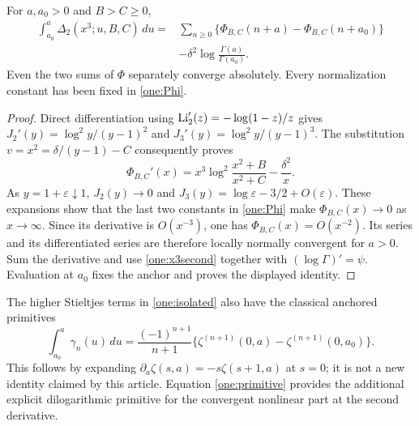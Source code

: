 \begin{theorem}
\label{thm:primitive}
For $a,a_0>0$ and $B>C\ge0$,
\begin{equation}\label{one:primitive}
 \boxed{\begin{aligned}
 \int_{a_0}^{a}\Delta_2(x^3;u,B,C)\,du
 ={}&\sum_{n\ge0}\{\Phi_{B,C}(n+a)-\Phi_{B,C}(n+a_0)\}\\
 &-\delta^2\log\frac{\Gamma(a)}{\Gamma(a_0)}.
 \end{aligned}}
\end{equation}
Even the two sums of $\Phi$ separately converge absolutely.  Every
normalization constant has been fixed in \eqref{one:Phi}.
\end{theorem}
\begin{proof}
Direct differentiation using
$\operatorname{Li}_2'(z)=-\log(1-z)/z$ gives
$J_2'(y)=\log^2y/(y-1)^2$ and
$J_3'(y)=\log^2y/(y-1)^3$.
The substitution $v=x^2=\delta/(y-1)-C$ consequently proves
\[
 \Phi_{B,C}'(x)=x^3\log^2\frac{x^2+B}{x^2+C}-\frac{\delta^2}{x}.
\]
As $y=1+\varepsilon\downarrow1$, $J_2(y)\to0$ and
$J_3(y)=\log\varepsilon-3/2+O(\varepsilon)$.
These expansions show that the last two constants in
\eqref{one:Phi} make $\Phi_{B,C}(x)\to0$ as $x\to\infty$.
Since its derivative is $O(x^{-3})$, one has
$\Phi_{B,C}(x)=O(x^{-2})$.  Its series and its differentiated
series are therefore locally normally convergent for $a>0$.
Sum the derivative and use \eqref{one:x3second} together with
$(\log\Gamma)'=\psi$.  Evaluation at $a_0$ fixes the anchor and
proves the displayed identity.
\end{proof}

The higher Stieltjes terms in \eqref{one:isolated} also have the
classical anchored primitives
\begin{equation}\label{one:Stieltjesprimitive}
 \int_{a_0}^a\gamma_n(u)\,du
   =\frac{(-1)^{n+1}}{n+1}
       \{\zeta^{(n+1)}(0,a)-\zeta^{(n+1)}(0,a_0)\}.
\end{equation}
This follows by expanding
$\partial_a\zeta(s,a)=-s\zeta(s+1,a)$ at $s=0$; it is not a
new identity claimed by this article.  Equation \eqref{one:primitive}
provides the additional explicit dilogarithmic primitive for the
convergent nonlinear part at the second derivative.
